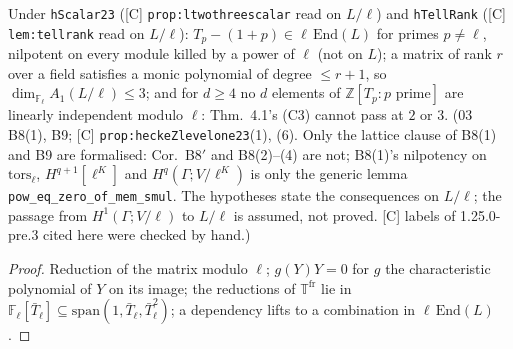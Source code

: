 \begin{lemma}\label{inf:heckez-levelone23}
  \leanok
  Under \texttt{hScalar23} ([C] \texttt{prop:ltwothreescalar} read on $L/\ell$) and \texttt{hTellRank} ([C] \texttt{lem:tellrank} read on $L/\ell$):
  $T_p-(1+p)\in\ell\,\mathrm{End}(L)$ for primes $p\ne\ell$, nilpotent on every module killed by a power of $\ell$ (not on $L$); a matrix of rank $r$ over
  a field satisfies a monic polynomial of degree $\le r+1$, so $\dim_{\mathbb F_\ell}A_1(L/\ell)\le3$; and for $d\ge4$ no $d$ elements of
  $\mathbb Z[T_p:p\text{ prime}]$ are linearly independent modulo $\ell$: Thm.~4.1's (C3) cannot pass at $2$ or $3$. (03 B8(1), B9;
  [C] \texttt{prop:heckeZlevelone23}(1), (6). Only the lattice clause of B8(1) and B9 are formalised: Cor.~B8$'$ and B8(2)--(4) are not; B8(1)'s nilpotency on $\mathrm{tors}_\ell$, $H^{q+1}[\ell^K]$ and $H^q(\Gamma;V/\ell^K)$ is only the generic lemma \texttt{pow\_eq\_zero\_of\_mem\_smul}. The hypotheses state the consequences on $L/\ell$; the passage from $H^1(\Gamma;V/\ell)$ to $L/\ell$ is assumed, not proved. [C] labels of 1.25.0-pre.3 cited here were checked by hand.)
\end{lemma}
\begin{proof}
  \leanok
  Reduction of the matrix modulo $\ell$; $g(Y)Y=0$ for $g$ the characteristic polynomial of $Y$ on its image; the reductions of $\mathbb T^{\mathrm{fr}}$ lie in
  $\mathbb F_\ell[\bar T_\ell]\subseteq\mathrm{span}(1,\bar T_\ell,\bar T_\ell^2)$; a dependency lifts to a combination in $\ell\,\mathrm{End}(L)$.
\end{proof}

